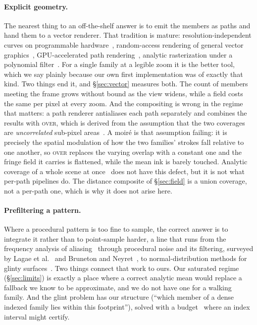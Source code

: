 \paragraph{Explicit geometry.}
The nearest thing to an off-the-shelf answer is to emit the members as paths and
hand them to a vector renderer. That tradition is mature: resolution-independent
curves on programmable hardware~\cite{LoopBlinn2005}, random-access rendering of
general vector graphics~\cite{NehabHoppe2008}, GPU-accelerated path
rendering~\cite{KilgardBolz2012}, analytic rasterization under a polynomial
filter~\cite{MansonSchaefer2013}. For a single family at a legible zoom it
is the better tool, which we say plainly because our own first implementation was
of exactly that kind. Two things end it, and \S\ref{sec:vector} measures both.
The count of members meeting the frame grows without bound as the view widens,
while a field costs the same per pixel at every zoom. And the compositing is
wrong in the regime that matters: a path renderer antialiases each path
separately and combines the results with \textsc{over}, which is derived from the
assumption that the two coverages are \emph{uncorrelated} sub-pixel
areas~\cite{PorterDuff1984}. A moir\'e is that assumption failing: it is
precisely the spatial modulation of how the two families' strokes fall relative
to one another, so \textsc{over} replaces the varying overlap with a constant
one and the fringe field it carries is flattened, while the mean ink is barely
touched. Analytic coverage of a whole scene at once~\cite{Catmull1978} does not
have this defect, but it is not what per-path pipelines do. The distance
composite of \S\ref{sec:field} is a union coverage, not a per-path one, which is
why it does not arise here.

\paragraph{Prefiltering a pattern.}
Where a procedural pattern is too fine to sample, the correct answer is to
integrate it rather than to point-sample harder, a line that runs from the
frequency analysis of aliasing~\cite{Crow1977, Mitchell1990} through
procedural noise and its filtering, surveyed by Lagae et
al.~\cite{Lagae2010} and Bruneton and Neyret~\cite{Bruneton2012}, to
normal-distribution methods for glinty
surfaces~\cite{Yan2014, Yan2016}. Two things connect that work to ours. Our
saturated regime (\S\ref{sec:limits}) is exactly a place where a correct analytic
mean would replace a fallback we know to be approximate, and we do not have one for
a walking family. And the glint problem has our structure (``which member of a
dense indexed family lies within this footprint''), solved with a
budget~\cite{Yan2016} where an index interval might certify.
